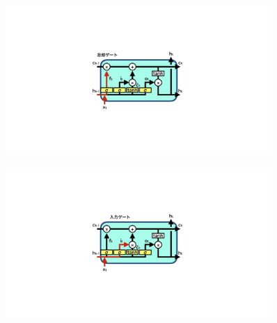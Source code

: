\begin{figure}[htbp]
 \centering
  \begin{minipage}{1.0\textwidth}
  \centering
   \begin{minipage}{0.48\textwidth}
    \centering
    \includegraphics[trim = 600 300 600 300, width=0.9\textwidth, clip]{Figure/2DeepLearning/12ForgetGate.png}
    \label{12ForgetGate}
   \end{minipage}
   \begin{minipage}{0.48\textwidth}
   \centering
    \includegraphics[trim = 600 300 600 300, width=0.9\textwidth, clip]{Figure/2DeepLearning/13InputGate.png}
    \label{13InputGate}
   \end{minipage}
  \end{minipage}
  

\end{figure}
